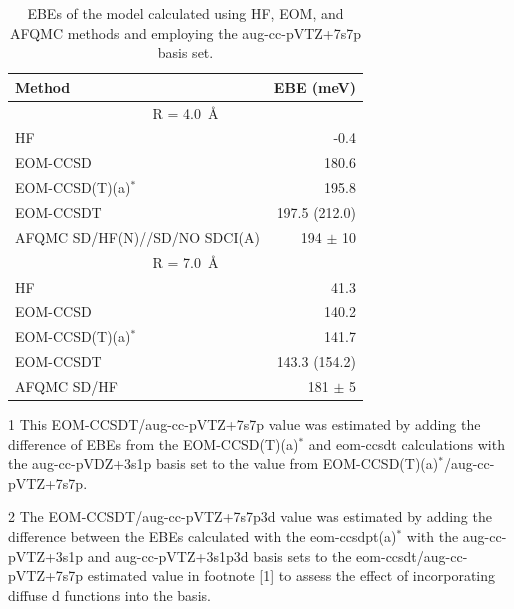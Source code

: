 \begin{table}[ht!]
    \caption{\label{tab:EOM} EBEs of the  model calculated using HF, EOM, and AFQMC methods and employing the aug-cc-pVTZ+7s7p basis set.}
\begin{threeparttable}
\begin{tabular}{lr}
Method & EBE (meV)                               \\
\hline
\multicolumn{2}{c}{R = \SI{4.0}{\angstrom}}     \\ 
HF            & -0.4        \\
EOM-CCSD      & 180.6          \\
EOM-CCSD(T)(a)$^*$ & 195.8          \\
    EOM-CCSDT     & 197.5\tnote{1}
    (212.0)\tnote{2} \\
AFQMC SD/HF(N)//SD/NO SDCI(A)     & 194 $\pm$ 10 \\ \hline
\multicolumn{2}{c}{R = \SI{7.0}{\angstrom}}                    \\ 
HF            & 41.3        \\
EOM-CCSD      & 140.2    \\
EOM-CCSD(T)(a)$^*$ & 141.7    \\
EOM-CCSDT    & 143.3\tnote{1}  (154.2)\tnote{2}     \\
AFQMC SD/HF     & 181 $\pm$ 5 \\ 
\end{tabular}
\begin{tablenotes}
\item[1] This EOM-CCSDT/aug-cc-pVTZ+7s7p value was estimated by adding the difference of EBEs from the EOM-CCSD(T)(a)$^*$ and eom-ccsdt calculations with the aug-cc-pVDZ+3s1p basis set to the value from EOM-CCSD(T)(a)$^*$/aug-cc-pVTZ+7s7p.
\item[2] The EOM-CCSDT/aug-cc-pVTZ+7s7p3d value was estimated by adding the difference between the EBEs calculated with the eom-ccsdpt(a)$^*$ with the aug-cc-pVTZ+3s1p and aug-cc-pVTZ+3s1p3d basis sets to the eom-ccsdt/aug-cc-pVTZ+7s7p estimated value in footnote [1] to assess the effect of incorporating diffuse d functions into the basis.
\end{tablenotes}
\end{threeparttable}
\end{table}

